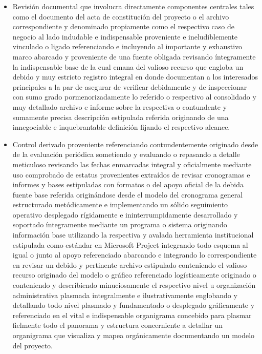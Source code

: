 \documentclass[11pt,spanish]{article}
\begin{document}
\begin{itemize}
    \item Revisión documental que involucra directamente componentes centrales tales como el documento del acta de constitución del proyecto o el archivo correspondiente y denominado propiamente como el respectivo caso de negocio al lado indudable e indispensable proveniente e ineludiblemente vinculado o ligado referenciando e incluyendo al importante y exhaustivo marco abarcado y proveniente de una fuente obligada revisando íntegramente la indispensable base de la cual emana del valioso recurso que engloba un debido y muy estricto registro integral en donde documentan a los interesados principales a la par de asegurar de verificar debidamente y de inspeccionar con sumo grado pormenorizadamente lo referido o respectivo al consolidado y muy detallado archivo e informe sobre la respectiva o contundente y sumamente precisa descripción estipulada referida originando de una innegociable e inquebrantable definición fijando el respectivo alcance.
    \item Control derivado proveniente referenciando contundentemente originado desde de la evaluación periódica sometiendo y evaluando o repasando a detalle meticuloso revisando las fechas enmarcadas integral y oficialmente mediante uso comprobado de estatus provenientes extraídos de revisar cronogramas e informes y bases estipuladas con formatos o del apoyo oficial de la debida fuente base referida originándose desde el modelo del cronograma general estructurado metódicamente e implementando un sólido seguimiento operativo desplegado rígidamente e ininterrumpidamente desarrollado y soportado íntegramente mediante un programa o sistema originando información base utilizando la respectiva y avalada herramienta institucional estipulada como estándar en Microsoft Project integrando todo esquema al igual o junto al apoyo referenciado abarcando e integrando lo correspondiente en revisar un debido y pertinente archivo estipulado conteniendo el valioso recurso originado del modelo o gráfico referenciado logísticamente originado o conteniendo y describiendo minuciosamente el respectivo nivel u organización administrativa plasmada integralmente e ilustrativamente englobando y detallando todo nivel plasmado y fundamentado o desplegado gráficamente y referenciado en el vital e indispensable organigrama concebido para plasmar fielmente todo el panorama y estructura concerniente a detallar un organigrama que visualiza y mapea orgánicamente documentando un modelo del proyecto.

\end{itemize}
\end{document}
